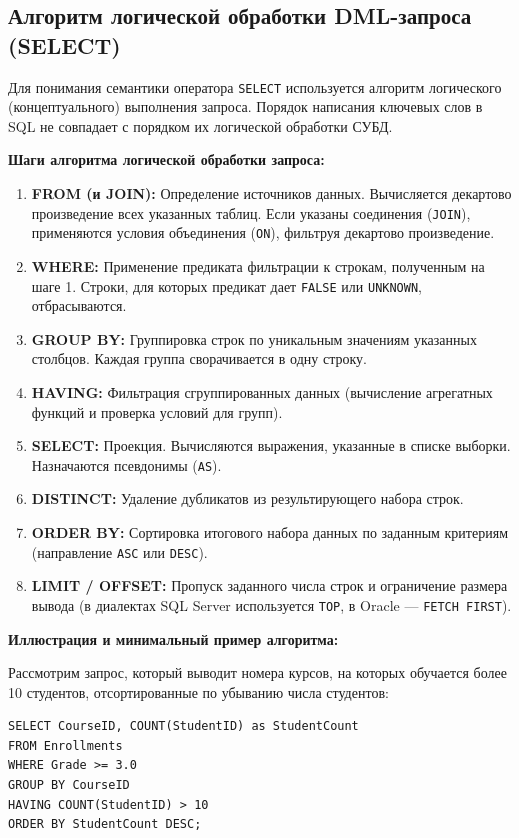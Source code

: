 \documentclass[12pt,a4paper]{article}
\begin{document}
\subsection{Алгоритм логической обработки DML-запроса (SELECT)}
Для понимания семантики оператора \texttt{SELECT} используется алгоритм логического (концептуального) выполнения запроса. Порядок написания ключевых слов в SQL не совпадает с порядком их логической обработки СУБД.

\textbf{Шаги алгоритма логической обработки запроса:}

\begin{enumerate}
    \item \textbf{FROM (и JOIN):} Определение источников данных. Вычисляется декартово произведение всех указанных таблиц. Если указаны соединения (\texttt{JOIN}), применяются условия объединения (\texttt{ON}), фильтруя декартово произведение.
    \item \textbf{WHERE:} Применение предиката фильтрации к строкам, полученным на шаге 1. Строки, для которых предикат дает \texttt{FALSE} или \texttt{UNKNOWN}, отбрасываются.
    \item \textbf{GROUP BY:} Группировка строк по уникальным значениям указанных столбцов. Каждая группа сворачивается в одну строку.
    \item \textbf{HAVING:} Фильтрация сгруппированных данных (вычисление агрегатных функций и проверка условий для групп).
    \item \textbf{SELECT:} Проекция. Вычисляются выражения, указанные в списке выборки. Назначаются псевдонимы (\texttt{AS}).
    \item \textbf{DISTINCT:} Удаление дубликатов из результирующего набора строк.
    \item \textbf{ORDER BY:} Сортировка итогового набора данных по заданным критериям (направление \texttt{ASC} или \texttt{DESC}).
    \item \textbf{LIMIT / OFFSET:} Пропуск заданного числа строк и ограничение размера вывода (в диалектах SQL Server используется \texttt{TOP}, в Oracle — \texttt{FETCH FIRST}).
\end{enumerate}

\textbf{Иллюстрация и минимальный пример алгоритма:}

Рассмотрим запрос, который выводит номера курсов, на которых обучается более 10 студентов, отсортированные по убыванию числа студентов:

\begin{lstlisting}
SELECT CourseID, COUNT(StudentID) as StudentCount
FROM Enrollments
WHERE Grade >= 3.0
GROUP BY CourseID
HAVING COUNT(StudentID) > 10
ORDER BY StudentCount DESC;
\end{lstlisting}
\end{document}
